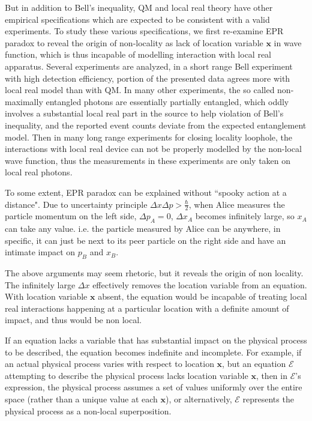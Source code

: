 \documentclass[prd,showpacs,twocolumn]{revtex4-1}
\begin{document}
But in addition to Bell's inequality, QM and local real theory have other empirical specifications which are expected to be consistent with a valid experiments. To study these various specifications, we first re-examine EPR paradox\cite{EPR} to reveal the origin of non-locality as lack of location variable $\mathbf x$ in wave function, which is thus incapable of modelling interaction with local real apparatus. Several experiments are analyzed, in a short range Bell experiment with high detection efficiency, portion of the presented data agrees more with local real model than with QM. In many other experiments, the so called non-maximally entangled photons are essentially partially entangled, which oddly involves a substantial local real part in the source to help violation of Bell's inequality, and the reported event counts deviate from the expected entanglement model. Then in many long range experiments for closing locality loophole, the interactions with local real device can not be properly modelled by the non-local wave function, thus the measurements in these experiments are only taken on local real photons.

To some extent, EPR paradox can be explained without ``spooky action at a distance". Due to uncertainty principle $\Delta x\Delta p > \frac{\hbar}{2}$, when Alice measures the particle momentum on the left side, $\Delta p_A=0$, $\Delta x_A$ becomes infinitely large, so $x_A$ can take any value. i.e. the particle measured by Alice can be anywhere, in specific, it can just be next to its peer particle on the right side and have an intimate impact on $p_B$ and $x_B$.

The above arguments may seem rhetoric, but it reveals the origin of non locality. The infinitely large $\Delta x$ effectively removes the location variable from an equation. With location variable $\mathbf x$ absent, the equation would be incapable of treating local real interactions happening at a particular location with a definite amount of impact, and thus would be non local.

If an equation lacks a variable that has substantial impact on the physical process to be described, the equation becomes indefinite and incomplete. For example, if an actual physical process varies with respect to location $\mathbf x$, but an equation $\mathcal E$ attempting to describe the physical process lacks location variable $\mathbf x$, then in $\mathcal E$'s expression, the physical process assumes a set of values uniformly over the entire space (rather than a unique value at each $\mathbf x$), or alternatively, $\mathcal E$ represents the physical process as a non-local superposition.
\end{document}

